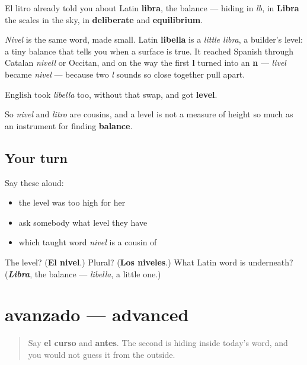 \begin{cousinweb}
El litro already told you about Latin \textbf{libra}, the balance — hiding in \emph{lb}, in \textbf{Libra} the scales in the sky, in \textbf{deliberate} and \textbf{equilibrium}.

\emph{Nivel} is the same word, made small. Latin \textbf{libella} is a \emph{little libra}, a builder's level: a tiny balance that tells you when a surface is true. It reached Spanish through Catalan \emph{nivell} or Occitan, and on the way the first \textbf{l} turned into an \textbf{n} — \emph{livel} became \emph{nivel} — because two \emph{l} sounds so close together pull apart.

English took \emph{libella} too, without that swap, and got \textbf{level}.

So \emph{nivel} and \emph{litro} are cousins, and a level is not a measure of height so much as an instrument for finding \textbf{balance}.
\end{cousinweb}

\subsection*{Your turn}
Say these aloud:

\begin{itemize}
\raggedright
  \item the level was too high for her
  \item ask somebody what level they have
  \item which taught word \emph{nivel} is a cousin of
\end{itemize}

\begin{tcolorbox}[breakable,colback=teal!4,colframe=teal!35!black,title={Before you move on}]
The level? (\textbf{El nivel}.) Plural? (\textbf{Los niveles}.) What Latin word is underneath? (\emph{\textbf{Libra}}, the balance — \emph{libella}, a little one.)
\end{tcolorbox}
\section[avanzado]{avanzado — advanced}

\label{lesson:ES-C471-avanzado}



\begin{quote}
Say \textbf{el curso} and \textbf{antes}. The second is hiding inside today's word, and you would not guess it from the outside.
\end{quote}

